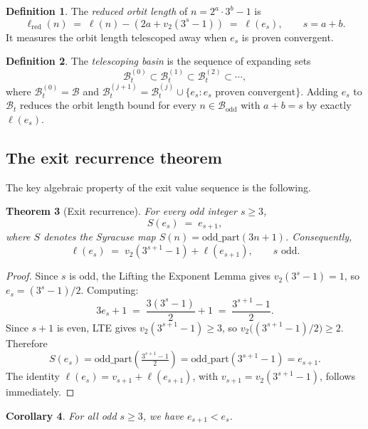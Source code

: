 \documentclass[12pt]{amsart}
\newtheorem{theorem}{Theorem}[section]
\newtheorem{corollary}[theorem]{Corollary}
\theoremstyle{definition}
\newtheorem{definition}[theorem]{Definition}
\newcommand{\basin}{\mathcal{B}}
\begin{document}
\begin{definition}
  The \emph{reduced orbit length} of $n = 2^a \cdot 3^b - 1$ is
  \[
    \ell_{\mathrm{red}}(n) \;=\; \ell(n) - (2a + v_2(3^s - 1))
    \;=\; \ell(e_s), \qquad s = a+b.
  \]
  It measures the orbit length telescoped away when $e_s$ is proven convergent.
\end{definition}

\begin{definition}
  The \emph{telescoping basin} is the sequence of expanding sets
  \[
    \basin_t^{(0)} \subset \basin_t^{(1)} \subset \basin_t^{(2)} \subset \cdots,
  \]
  where $\basin_t^{(0)} = \basin$ and
  $\basin_t^{(j+1)} = \basin_t^{(j)} \cup \{e_s : \text{$e_s$ proven convergent}\}$.
  Adding $e_s$ to $\basin_t$ reduces the orbit length bound for every
  $n \in \basin_{\mathrm{odd}}$ with $a + b = s$ by exactly $\ell(e_s)$.
\end{definition}

\subsection{The exit recurrence theorem}

The key algebraic property of the exit value sequence is the following.

\begin{theorem}[Exit recurrence]\label{thm:exitrecur}
  For every odd integer $s \geq 3$,
  \[
    S(e_s) \;=\; e_{s+1},
  \]
  where $S$ denotes the Syracuse map $S(n) = \mathrm{odd\_part}(3n+1)$.
  Consequently,
  \[
    \ell(e_s) \;=\; v_2(3^{s+1}-1) + \ell(e_{s+1}), \qquad s \text{ odd}.
  \]
\end{theorem}

\begin{proof}
  Since $s$ is odd, the Lifting the Exponent Lemma gives $v_2(3^s - 1) = 1$,
  so $e_s = (3^s - 1)/2$.  Computing:
  \[
    3 e_s + 1
    \;=\;
    \frac{3(3^s - 1)}{2} + 1
    \;=\;
    \frac{3^{s+1} - 1}{2}.
  \]
  Since $s + 1$ is even, LTE gives $v_2(3^{s+1}-1) \geq 3$, so
  $v_2\bigl((3^{s+1}-1)/2\bigr) \geq 2$.  Therefore
  \[
    S(e_s)
    = \mathrm{odd\_part}\!\left(\tfrac{3^{s+1}-1}{2}\right)
    = \mathrm{odd\_part}(3^{s+1}-1)
    = e_{s+1}.
  \]
  The identity $\ell(e_s) = v_{s+1} + \ell(e_{s+1})$,
  with $v_{s+1} = v_2(3^{s+1}-1)$, follows immediately.
\end{proof}

\begin{corollary}\label{cor:descent}
  For all odd $s \geq 3$, we have $e_{s+1} < e_s$.
\end{corollary}
\end{document}
